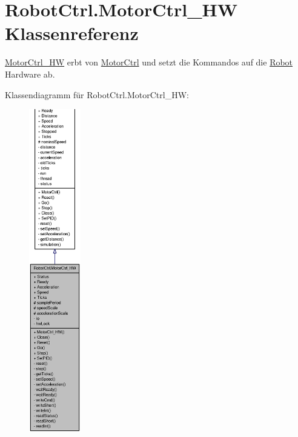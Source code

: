 \hypertarget{class_robot_ctrl_1_1_motor_ctrl___h_w}{
\section{RobotCtrl.MotorCtrl\_\-HW Klassenreferenz}
\label{class_robot_ctrl_1_1_motor_ctrl___h_w}
}


\hyperlink{class_robot_ctrl_1_1_motor_ctrl___h_w}{MotorCtrl\_\-HW} erbt von \hyperlink{class_robot_ctrl_1_1_motor_ctrl}{MotorCtrl} und setzt die Kommandos auf die \hyperlink{class_robot_ctrl_1_1_robot}{Robot} Hardware ab.  




Klassendiagramm für RobotCtrl.MotorCtrl\_\-HW:\nopagebreak
\begin{figure}[H]
\begin{center}
\leavevmode
\includegraphics[height=400pt]{class_robot_ctrl_1_1_motor_ctrl___h_w__inherit__graph}
\end{center}
\end{figure}


